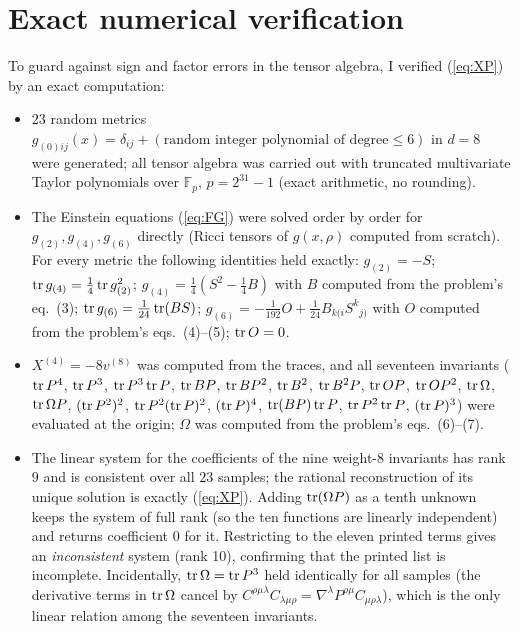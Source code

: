 \section{Exact numerical verification}\label{sec:num}
To guard against sign and factor errors in the tensor algebra, I verified (\ref{eq:XP}) by an exact computation:
\begin{itemize}
\item $23$ random metrics $g_{(0)ij}(x)=\delta_{ij}+(\text{random integer polynomial of degree}\le6)$ in $d=8$ were generated; all tensor algebra was carried out with truncated multivariate Taylor polynomials over $\mathbb F_p$, $p=2^{31}-1$ (exact arithmetic, no rounding).
\item The Einstein equations (\ref{eq:FG}) were solved order by order for $g_{(2)},g_{(4)},g_{(6)}$ directly (Ricci tensors of $g(x,\rho)$ computed from scratch). For every metric the following identities held exactly: $g_{(2)}=-S$; $\operatorname{tr} g_{(4)}=\frac14\operatorname{tr} g_{(2)}^2$; $g_{(4)}=\frac14(S^2-\frac14B)$ with $B$ computed from the problem's eq.~(3); $\operatorname{tr} g_{(6)}=\frac1{24}\operatorname{tr}(BS)$; $g_{(6)}=-\frac{1}{192}O+\frac1{24}B_{k(i}S^k{}_{j)}$ with $O$ computed from the problem's eqs.~(4)--(5); $\operatorname{tr} O=0$.
\item $X^{(4)}=-8v^{(8)}$ was computed from the traces, and all seventeen invariants ($\operatorname{tr} P^4$, $\operatorname{tr} P^3$, $\operatorname{tr} P^3\operatorname{tr} P$, $\operatorname{tr} BP$, $\operatorname{tr} BP^2$, $\operatorname{tr} B^2$, $\operatorname{tr} B^2P$, $\operatorname{tr} OP$, $\operatorname{tr} OP^2$, $\operatorname{tr}\Omega$, $\operatorname{tr}\Omega P$, $(\operatorname{tr} P^2)^2$, $\operatorname{tr} P^2(\operatorname{tr} P)^2$, $(\operatorname{tr} P)^4$, $\operatorname{tr}(BP)\operatorname{tr} P$, $\operatorname{tr} P^2\operatorname{tr} P$, $(\operatorname{tr} P)^3$) were evaluated at the origin; $\Omega$ was computed from the problem's eqs.~(6)--(7).
\item The linear system for the coefficients of the nine weight-8 invariants has rank $9$ and is consistent over all $23$ samples; the rational reconstruction of its unique solution is exactly (\ref{eq:XP}). Adding $\operatorname{tr}(\Omega P)$ as a tenth unknown keeps the system of full rank (so the ten functions are linearly independent) and returns coefficient $0$ for it. Restricting to the eleven printed terms gives an \emph{inconsistent} system (rank 10), confirming that the printed list is incomplete. Incidentally, $\operatorname{tr}\Omega=\operatorname{tr} P^3$ held identically for all samples (the derivative terms in $\operatorname{tr}\Omega$ cancel by $C^{\rho\mu\lambda}C_{\lambda\mu\rho}=\nabla^\lambda P^{\rho\mu}C_{\mu\rho\lambda}$), which is the only linear relation among the seventeen invariants.
\end{itemize}

